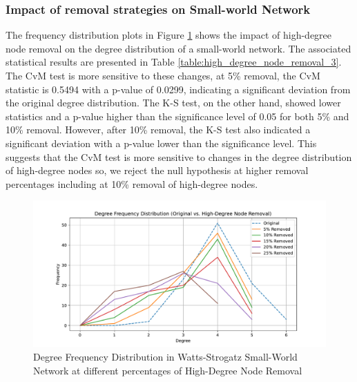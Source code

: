 \documentclass[conference]{IEEEtran} %
\begin{document}
\subsubsection{Impact of removal strategies on Small-world Network}

The frequency distribution plots in Figure \ref{fig:15.1} shows the impact of high-degree node removal on the degree distribution of a small-world network. The associated statistical results are presented in Table \ref{table:high_degree_node_removal_3}. The CvM test is more sensitive to these changes, at 5\% removal, the CvM statistic is 0.5494 with a p-value of 0.0299, indicating a significant deviation from the original degree distribution. The K-S test, on the other hand, showed lower statistics and a p-value higher than the significance level of 0.05 for both 5\% and 10\% removal. However, after 10\% removal, the K-S test also indicated a significant deviation with a p-value lower than the significance level. This suggests that the CvM test is more sensitive to changes in the degree distribution of high-degree nodes so, we reject the null hypothesis at higher removal percentages including at 10\% removal of high-degree nodes.

\begin{figure}[t]
  \centering
  \includegraphics[width=1.1\linewidth]{small_world_network_frequency_distribution_plot_High-Degree Node Removal.pdf}
  \caption{Degree Frequency Distribution in Watts-Strogatz Small-World Network at different percentages of High-Degree Node Removal}
  \label{fig:15.1}
\end{figure}
\end{document}
